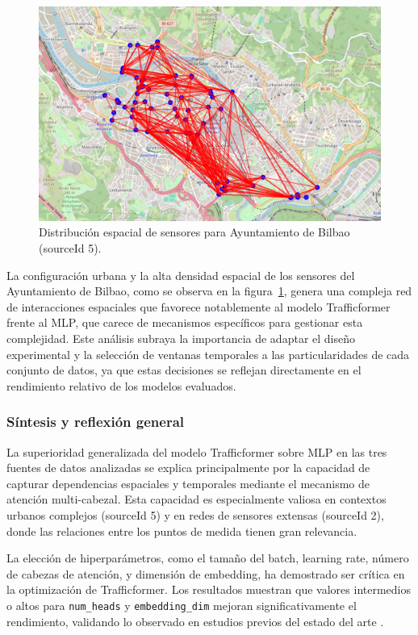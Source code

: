 \begin{figure}[H]
	\centering
	\includegraphics[width=0.7\linewidth]{includes/cap5/source_id_5_meters_mask.png}
	\caption{Distribución espacial de sensores para Ayuntamiento de Bilbao (sourceId 5).}
	\label{fig:sensores_sid5}
\end{figure}

La configuración urbana y la alta densidad espacial de los sensores del Ayuntamiento de Bilbao, como se observa en la figura~\ref{fig:sensores_sid5}, genera una compleja red de interacciones espaciales que favorece notablemente al modelo Trafficformer frente al MLP, que carece de mecanismos específicos para gestionar esta complejidad. Este análisis subraya la importancia de adaptar el diseño experimental y la selección de ventanas temporales a las particularidades de cada conjunto de datos, ya que estas decisiones se reflejan directamente en el rendimiento relativo de los modelos evaluados.

\subsubsection*{Síntesis y reflexión general}

La superioridad generalizada del modelo Trafficformer sobre MLP en las tres fuentes de datos analizadas se explica principalmente por la capacidad de capturar dependencias espaciales y temporales mediante el mecanismo de atención multi-cabezal. Esta capacidad es especialmente valiosa en contextos urbanos complejos (sourceId 5) y en redes de sensores extensas (sourceId 2), donde las relaciones entre los puntos de medida tienen gran relevancia.

La elección de hiperparámetros, como el tamaño del batch, learning rate, número de cabezas de atención, y dimensión de embedding, ha demostrado ser crítica en la optimización de Trafficformer. Los resultados muestran que valores intermedios o altos para \texttt{num\_heads} y \texttt{embedding\_dim} mejoran significativamente el rendimiento, validando lo observado en estudios previos del estado del arte \cite{trafficformer}.


